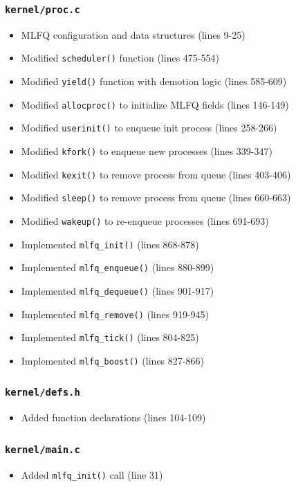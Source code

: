 \documentclass[11pt,a4paper]{article}
\begin{document}
\subsubsection{\texttt{kernel/proc.c}}
\begin{itemize}
    \item MLFQ configuration and data structures (lines 9-25)
    \item Modified \texttt{scheduler()} function (lines 475-554)
    \item Modified \texttt{yield()} function with demotion logic (lines 585-609)
    \item Modified \texttt{allocproc()} to initialize MLFQ fields (lines 146-149)
    \item Modified \texttt{userinit()} to enqueue init process (lines 258-266)
    \item Modified \texttt{kfork()} to enqueue new processes (lines 339-347)
    \item Modified \texttt{kexit()} to remove process from queue (lines 403-406)
    \item Modified \texttt{sleep()} to remove process from queue (lines 660-663)
    \item Modified \texttt{wakeup()} to re-enqueue processes (lines 691-693)
    \item Implemented \texttt{mlfq\_init()} (lines 868-878)
    \item Implemented \texttt{mlfq\_enqueue()} (lines 880-899)
    \item Implemented \texttt{mlfq\_dequeue()} (lines 901-917)
    \item Implemented \texttt{mlfq\_remove()} (lines 919-945)
    \item Implemented \texttt{mlfq\_tick()} (lines 804-825)
    \item Implemented \texttt{mlfq\_boost()} (lines 827-866)
\end{itemize}

\subsubsection{\texttt{kernel/defs.h}}
\begin{itemize}
    \item Added function declarations (lines 104-109)
\end{itemize}

\subsubsection{\texttt{kernel/main.c}}
\begin{itemize}
    \item Added \texttt{mlfq\_init()} call (line 31)
\end{itemize}
\end{document}
